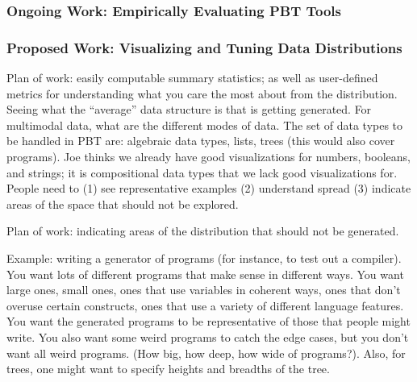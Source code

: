 \subsubsection{Ongoing Work: Empirically Evaluating PBT Tools}

\subsubsection{Proposed Work: Visualizing and Tuning Data Distributions}

Plan of work: easily computable summary statistics; as well as user-defined
metrics for understanding what you care the most about from the distribution.
Seeing what the “average” data structure is that is getting generated. For
multimodal data, what are the different modes of data. The set of data types to
be handled in PBT are: algebraic data types, lists, trees (this would also cover
programs). Joe thinks we already have good visualizations for numbers, booleans,
and strings; it is compositional data types that we lack good visualizations
for. People need to (1) see representative examples (2) understand spread (3)
indicate areas of the space that should not be explored.   

Plan of work: indicating areas of the distribution that should not be generated.

Example: writing a generator of programs (for instance, to test out a compiler).
You want lots of different programs that make sense in different ways. You want
large ones, small ones, ones that use variables in coherent ways, ones that
don’t overuse certain constructs, ones that use a variety of different language
features. You want the generated programs to be representative of those that
people might write. You also want some weird programs to catch the edge cases,
but you don’t want all weird programs. (How big, how deep, how wide of
programs?). Also, for trees, one might want to specify heights and breadths of
the tree.


